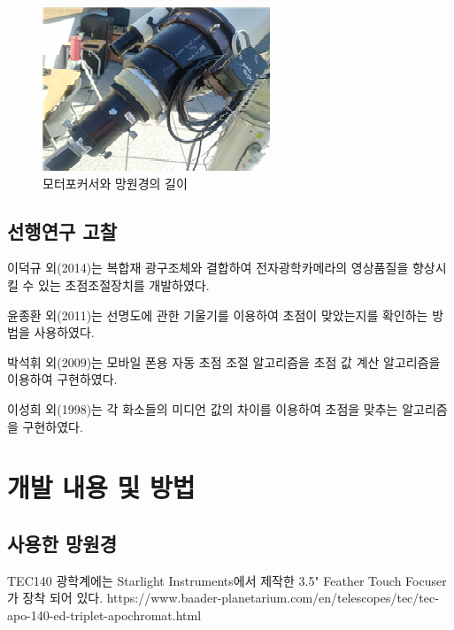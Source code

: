 \documentclass{abstract_hutech}
\begin{document}
\begin{figure}[h]
	\centering
	\includegraphics[width=1\linewidth]{telescope3}
	\caption{모터포커서와 망원경의 길이}
	\label{fig:telescope3}
\end{figure}

\subsection{선행연구 고찰}

이덕규 외(2014)는 복합재 광구조체와 결합하여 전자광학카메라의 영상품질을 향상시킬 수 있는 초점조절장치를 개발하였다.\cite{leedukgu2014}

윤종환 외(2011)는 선명도에 관한 기울기를 이용하여 초점이 맞았는지를 확인하는 방법을 사용하였다.\cite{yunjonghwan2011lcd}

박석휘 외(2009)는 모바일 폰용 자동 초점 조절 알고리즘을 초점 값 계산 알고리즘을 이용하여 구현하였다.\cite{parksukhui2009Median}

이성희 외(1998)는 각 화소들의 미디언 값의 차이를 이용하여 초점을 맞추는 알고리즘을 구현하였다.\cite{leeseonghee1998Median}


\section{개발 내용 및 방법}

\subsection{사용한 망원경}

TEC140 광학계에는 Starlight Instruments에서 제작한 3.5" Feather Touch Focuser가 장착 되어 있다. 
https://www.baader-planetarium.com/en/telescopes/tec/tec-apo-140-ed-triplet-apochromat.html 
\end{document}
